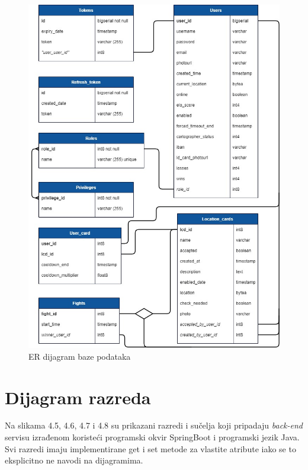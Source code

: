 				\begin{figure}[H]
					\centering
					\includegraphics[scale=0.6]{slike/GeoFighterModel} 
					\caption{ER dijagram baze podataka}
					\label{fig:ERmodel}
				\end{figure}				
				
				
			
			\eject
			
			
		\section{Dijagram razreda}
		
			
			\textnormal{Na slikama 4.5, 4.6, 4.7 i 4.8 su prikazani razredi i sučelja koji pripadaju \textit{back-end} servisu izrađenom koristeći programski okvir SpringBoot i programski jezik Java. Svi razredi imaju implementirane get i set metode za vlastite atribute iako se to eksplicitno ne navodi na dijagramima.} \\
			
